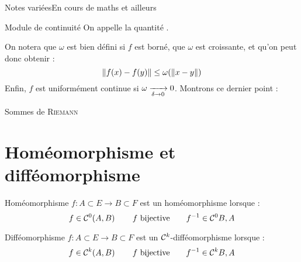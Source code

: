 \documentclass[a4paper,french,bookmarks]{article}
\begin{document}
    \renewcommand{\thesection}{\Roman{section}}
    \renewcommand{\thesection}{\Roman{section}}
    \renewcommand{\labelenumi}{\Roman{section}.\arabic{enumi}.}
    \renewcommand*{\labelenumii}{\alph{enumii}.}

    {Notes variées}{En cours de maths et ailleurs}
    
    \begin{definition}{Module de continuité}{}
        On appelle  la quantité .
    \end{definition}
    On notera que $\omega$ est bien défini si $f$ est borné, que $\omega$ est croissante, et qu'on peut donc obtenir :
    \[ \left\lVert f\!\left(x\right) - f\!\left(y\right)\right\rVert \leq \omega \!\left(\left\lVert x - y\right\rVert\right)\]
    Enfin, $f$ est uniformément continue si $\omega \lima{\delta \to 0} 0$. Montrons ce dernier point :
    
    Sommes de \textsc{Riemann}
    
    \newpage
    
    \section{Homéomorphisme et difféomorphisme}
    
    \begin{definition}{Homéomorphisme}{}
        $f : A \subset E \rightarrow B \subset F$ est un homéomorphisme lorsque :
        \[ f \in \mathcal{C}^0\!\left(A, B\right) \qquad f \ \text{bijective} \qquad f^{-1} \in \mathcal{C}^0{B, A}\]
    \end{definition}
    
    \begin{definition}{Difféomorphisme}{}
        $f : A \subset E \rightarrow B \subset F$ est un $\mathcal{C}^k$-difféomorphisme lorsque :
        \[ f \in \bcC^k\p{A, B} \qquad f \ \text{bijective} \qquad f^{-1} \in \bcC^k{B, A}\]
    \end{definition}
    
\end{document}
